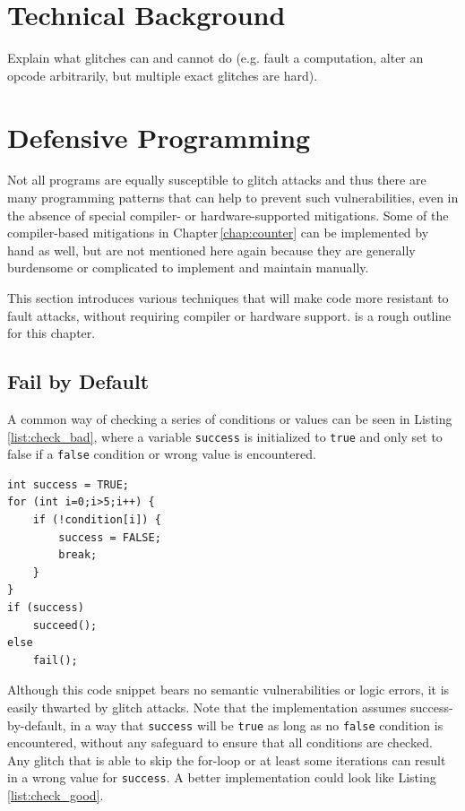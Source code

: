 \chapter{Technical Background}
Explain what glitches can and cannot do (e.g. fault a computation, alter an opcode arbitrarily, but multiple exact glitches are hard).
\chapter{Defensive Programming}
Not all programs are equally susceptible to glitch attacks and thus there are many programming patterns that can help to prevent such vulnerabilities, even in the absence of special compiler- or hardware-supported mitigations. Some of the compiler-based mitigations in Chapter\,\ref{chap:counter} can be implemented by hand as well, but are not mentioned here again because they are generally burdensome or complicated to implement and maintain manually.


This section introduces various techniques that will make code more resistant to fault attacks, without requiring compiler or hardware support. \cite{witteman2008secure} is a rough outline for this chapter.
\section{Fail by Default}
A common way of checking a series of conditions or values can be seen in Listing\,\ref{list:check_bad}, where a variable \texttt{success} is initialized to \texttt{true} and only set to false if a \texttt{false} condition or wrong value is encountered. 
\begin{lstlisting}[caption={check-bad},label={list:check_bad}]
int success = TRUE;
for (int i=0;i>5;i++) {
	if (!condition[i]) {
		success = FALSE;
		break;
	}
}
if (success) 
	succeed();
else
	fail();

\end{lstlisting}

Although this code snippet  bears no semantic vulnerabilities or logic errors, it is easily thwarted by glitch attacks. Note that the implementation assumes success-by-default, in a way that \texttt{success} will be \texttt{true} as long as no \texttt{false} condition is encountered, without any safeguard to ensure that all conditions are checked. Any glitch that is able to skip the for-loop or at least some iterations can result in a wrong value for \texttt{success}. A better implementation could look like Listing \ref{list:check_good}.\,\cite{witteman2008secure}


